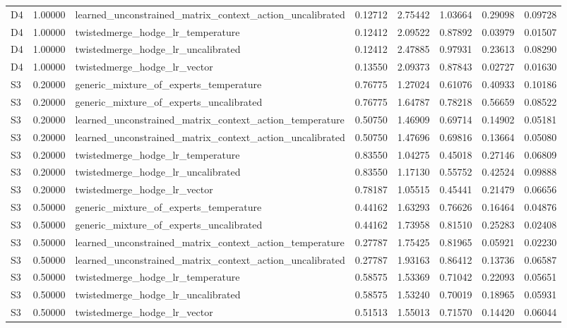 \begin{tabular}{lrlrrrrr}
D4 & 1.00000 & learned_unconstrained_matrix_context_action_uncalibrated & 0.12712 & 2.75442 & 1.03664 & 0.29098 & 0.09728 \\
D4 & 1.00000 & twistedmerge_hodge_lr_temperature & 0.12412 & 2.09522 & 0.87892 & 0.03979 & 0.01507 \\
D4 & 1.00000 & twistedmerge_hodge_lr_uncalibrated & 0.12412 & 2.47885 & 0.97931 & 0.23613 & 0.08290 \\
D4 & 1.00000 & twistedmerge_hodge_lr_vector & 0.13550 & 2.09373 & 0.87843 & 0.02727 & 0.01630 \\
S3 & 0.20000 & generic_mixture_of_experts_temperature & 0.76775 & 1.27024 & 0.61076 & 0.40933 & 0.10186 \\
S3 & 0.20000 & generic_mixture_of_experts_uncalibrated & 0.76775 & 1.64787 & 0.78218 & 0.56659 & 0.08522 \\
S3 & 0.20000 & learned_unconstrained_matrix_context_action_temperature & 0.50750 & 1.46909 & 0.69714 & 0.14902 & 0.05181 \\
S3 & 0.20000 & learned_unconstrained_matrix_context_action_uncalibrated & 0.50750 & 1.47696 & 0.69816 & 0.13664 & 0.05080 \\
S3 & 0.20000 & twistedmerge_hodge_lr_temperature & 0.83550 & 1.04275 & 0.45018 & 0.27146 & 0.06809 \\
S3 & 0.20000 & twistedmerge_hodge_lr_uncalibrated & 0.83550 & 1.17130 & 0.55752 & 0.42524 & 0.09888 \\
S3 & 0.20000 & twistedmerge_hodge_lr_vector & 0.78187 & 1.05515 & 0.45441 & 0.21479 & 0.06656 \\
S3 & 0.50000 & generic_mixture_of_experts_temperature & 0.44162 & 1.63293 & 0.76626 & 0.16464 & 0.04876 \\
S3 & 0.50000 & generic_mixture_of_experts_uncalibrated & 0.44162 & 1.73958 & 0.81510 & 0.25283 & 0.02408 \\
S3 & 0.50000 & learned_unconstrained_matrix_context_action_temperature & 0.27787 & 1.75425 & 0.81965 & 0.05921 & 0.02230 \\
S3 & 0.50000 & learned_unconstrained_matrix_context_action_uncalibrated & 0.27787 & 1.93163 & 0.86412 & 0.13736 & 0.06587 \\
S3 & 0.50000 & twistedmerge_hodge_lr_temperature & 0.58575 & 1.53369 & 0.71042 & 0.22093 & 0.05651 \\
S3 & 0.50000 & twistedmerge_hodge_lr_uncalibrated & 0.58575 & 1.53240 & 0.70019 & 0.18965 & 0.05931 \\
S3 & 0.50000 & twistedmerge_hodge_lr_vector & 0.51513 & 1.55013 & 0.71570 & 0.14420 & 0.06044 \\

\end{tabular}
